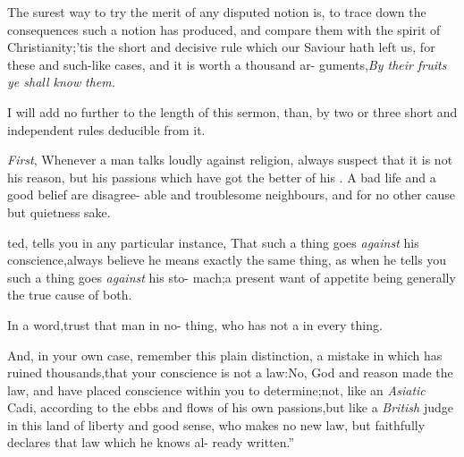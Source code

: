 \documentclass{article}
\begin{document}
\lqq The surest way to try the merit of\break
\lqq any disputed notion is, to trace down\break
\lqq the consequences such a notion has\break
\lqq produced, and compare them with the\break
\lqq spirit of Christianity;\tsh ’tis the short\break
\lqq and decisive rule which our Saviour\break
\lqq hath left us, for these and such-like\break
\lqq cases, and it is worth a thousand ar-\break
\lqq guments,\tsk \textit{By their fruits ye shall know}\break
\lqq \textit{them.} 

\lqq I will add no further to the length\break
\lqq of this sermon, than, by two or three
\lqq short and independent rules deducible\break
\lqq from it.

\lqq \textit{First}, Whenever a man talks loudly\break
\lqq against religion, always suspect that it\break
\lqq is not his reason, but his passions which\break
\lqq have got the better of his . A\break
\lqq bad life and a good belief are disagree-\break
\lqq able and troublesome neighbours, and\break
\lqq {}\break
\lqq for no other cause but quietness sake.

\lqq {}\break
\lqq ted, tells you in any particular instance,\break
\lqq \tsk That such a thing goes \textit{against} his\break
\lqq conscience,\tsk always believe he means\break
\lqq exactly the same thing, as when he tells\break
\lqq you such a thing goes \textit{against} his sto-\break
\lqq mach;\tsk a present want of appetite\break
\lqq being generally the true cause of both.\\\newpage

\lqq In a word,\tsk trust that man in no-\break
\lqq thing, who has not a  in\break
\lqq every thing.

\lqq And, in your own case, remember\break
\lqq this plain distinction, a mistake in\break
\lqq which has ruined thousands,\tsk that\break
\lqq your conscience is not a law:\tsk No,\break
\lqq God and reason made the law, and\break
\lqq have placed conscience within you to\break
\lqq determine;\tsh not, like an \textit{Asiatic} Cadi,\break
\lqq according to the ebbs and flows of his\break
\lqq own passions,\tsk but like a \textit{British} judge\break
\lqq in this land of liberty and good sense,\break
\lqq who makes no new law, but faithfully\break
\lqq declares that law which he knows al-\break
\lqq ready written.”

\bigskip
\end{document}
